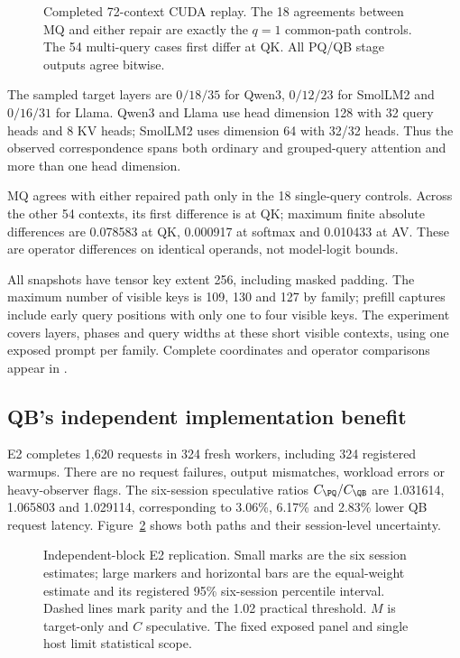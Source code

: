 \begin{figure}[t]\centering
\resizebox{\columnwidth}{!}{}
\caption{Completed 72-context CUDA replay. The 18 agreements between MQ and either repair are exactly the $q=1$ common-path controls. The 54 multi-query cases first differ at QK. All PQ/QB stage outputs agree bitwise.}
\label{fig:numeric}
\end{figure}

The sampled target layers are $0/18/35$ for Qwen3, $0/12/23$ for SmolLM2 and $0/16/31$ for Llama. Qwen3 and Llama use head dimension 128 with 32 query heads and 8 KV heads; SmolLM2 uses dimension 64 with 32/32 heads. Thus the observed correspondence spans both ordinary and grouped-query attention and more than one head dimension.

MQ agrees with either repaired path only in the 18 single-query controls. Across the other 54 contexts, its first difference is at QK; maximum finite absolute differences are 0.078583 at QK, 0.000917 at softmax and 0.010433 at AV. These are operator differences on identical operands, not model-logit bounds.

All snapshots have tensor key extent 256, including masked padding. The maximum number of visible keys is 109, 130 and 127 by family; prefill captures include early query positions with only one to four visible keys. The experiment covers layers, phases and query widths at these short visible contexts, using one exposed prompt per family. Complete coordinates and operator comparisons appear in .

\subsection{QB's independent implementation benefit}
\label{sec:e2}
E2 completes 1,620 requests in 324 fresh workers, including 324 registered warmups. There are no request failures, output mismatches, workload errors or heavy-observer flags. The six-session speculative ratios $C_{\PQ}/C_{\QB}$ are 1.031614, 1.065803 and 1.029114, corresponding to 3.06\%, 6.17\% and 2.83\% lower QB request latency. Figure~\ref{fig:e2} shows both paths and their session-level uncertainty.

\begin{figure}[t]\centering

\caption{Independent-block E2 replication. Small marks are the six session estimates; large markers and horizontal bars are the equal-weight estimate and its registered 95\% six-session percentile interval. Dashed lines mark parity and the 1.02 practical threshold. $M$ is target-only and $C$ speculative. The fixed exposed panel and single host limit statistical scope.}
\label{fig:e2}
\end{figure}


